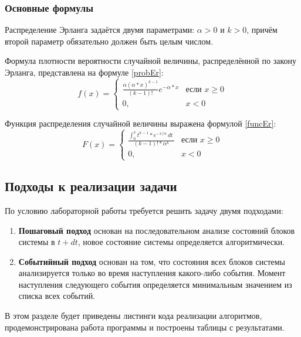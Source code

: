 \subsubsection*{Основные формулы}
Распределение Эрланга задаётся двумя параметрами: $\alpha > 0$ и $k > 0$, причём второй параметр обязательно должен быть целым числом. 

Формула плотности вероятности случайной величины, распределённой по закону Эрланга, представлена на формуле \ref{probEr}:
\begin{equation}
	\label{probEr}
	f(x)= 
	\begin{cases}
		\frac{\alpha  (\alpha*x)^{k - 1}} {(k - 1)!}e^{-\alpha*x} & \text{если } x \geq 0 \\
		0,              & x < 0
	\end{cases}
\end{equation}

Функция распределения случайной величины выражена формулой \ref{funcEr}:
\begin{equation}
	\label{funcEr}
	F(x)= 
	\begin{cases}
		\frac{\int_{0}^{x} t^{k-1}*e^{-x/\alpha} \,dt \ } {(k - 1)!*\alpha^k} & \text{если } x \geq 0 \\
		0,              & x < 0
	\end{cases}
\end{equation}

\newpage

\subsection*{Подходы к реализации задачи}
По условию лабораторной работы требуется решить задачу двумя подходами:
\begin{enumerate}
	\item \textbf{Пошаговый подход} основан на последовательном анализе состояний блоков системы в $t + dt$, новое состояние системы определяется алгоритмически.
	
	\item \textbf{Событийный подход} основан на том, что состояния всех блоков системы анализируется только во время наступления какого-либо события. Момент наступления следующего события определяется минимальным значением из списка всех событий.
	
\end{enumerate}

\newpage

В этом разделе будет приведены листинги кода реализации алгоритмов, продемонстрирована работа программы и построены таблицы с результатами.

